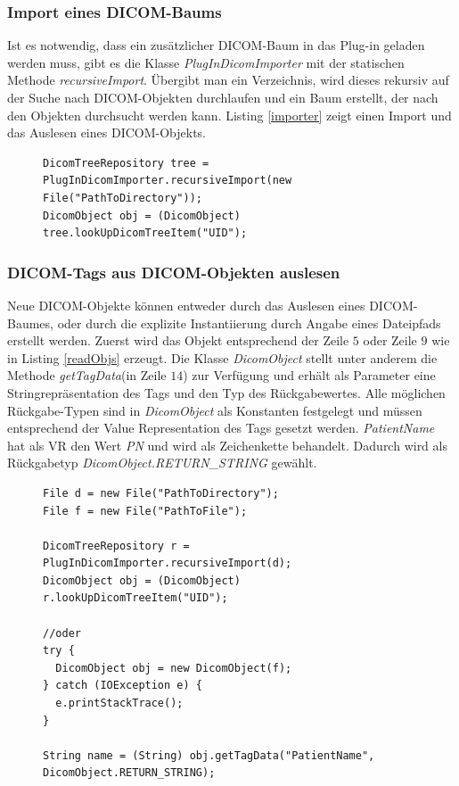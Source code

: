\subsubsection{Import eines DICOM-Baums}

Ist es notwendig, dass ein zusätzlicher DICOM-Baum in das Plug-in geladen werden muss, gibt es die Klasse \textit{PlugInDicomImporter} mit der statischen Methode \textit{recursiveImport}. Übergibt man ein Verzeichnis, wird dieses rekursiv auf der Suche nach DICOM-Objekten durchlaufen und ein Baum erstellt, der nach den Objekten durchsucht werden kann. Listing \ref{importer} zeigt einen Import und das Auslesen eines DICOM-Objekts.

\begin{figure}[htbp]
\begin{lstlisting}[frame=leftline]
DicomTreeRepository tree = PlugInDicomImporter.recursiveImport(new File("PathToDirectory"));
DicomObject obj = (DicomObject) tree.lookUpDicomTreeItem("UID");
\end{lstlisting}
\end{figure}

\subsubsection{DICOM-Tags aus DICOM-Objekten auslesen}
Neue DICOM-Objekte können entweder durch das Auslesen eines DICOM-Baumes, oder durch die explizite Instantiierung durch Angabe eines Dateipfads erstellt werden. Zuerst wird das Objekt entsprechend der Zeile $5$ oder Zeile $9$ wie in Listing \ref{readObjs} erzeugt. Die Klasse \textit{DicomObject} stellt unter anderem die Methode \textit{getTagData}(in Zeile $14$) zur Verfügung und erhält als Parameter eine Stringrepräsentation des Tags und den Typ des Rückgabewertes. Alle möglichen Rückgabe-Typen sind in \textit{DicomObject} als Konstanten festgelegt und müssen entsprechend der Value Representation des Tags gesetzt werden. \textit{Patient\-Name} hat als VR den Wert \textit{PN} und wird als Zeichenkette behandelt. Dadurch wird als Rückgabetyp \textit{DicomObject.RETURN\_STRING} gewählt.

\begin{figure}[htbp]
\begin{lstlisting}[frame=leftline]
File d = new File("PathToDirectory");
File f = new File("PathToFile");
		
DicomTreeRepository r = PlugInDicomImporter.recursiveImport(d);
DicomObject obj = (DicomObject) r.lookUpDicomTreeItem("UID");
		
//oder
try {
  DicomObject obj = new DicomObject(f);
} catch (IOException e) {
  e.printStackTrace();
}
		
String name = (String) obj.getTagData("PatientName", DicomObject.RETURN_STRING);
\end{lstlisting}
\end{figure}

